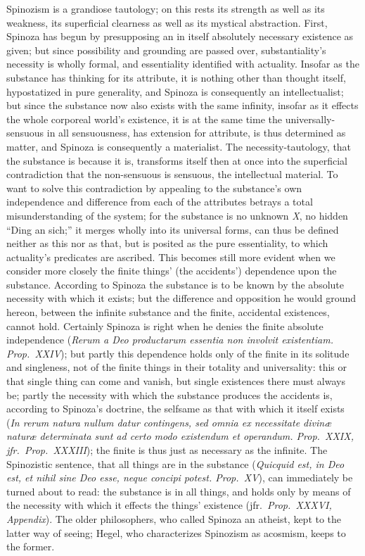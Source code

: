 \documentclass[12pt]{book}
\begin{document}
Spinozism is a grandiose tautology; on this rests its strength as well as
its weakness, its superficial clearness as well as its mystical abstraction.
First, Spinoza has begun by presupposing an in itself absolutely necessary
existence as given; but since possibility and grounding are passed over,
substantiality's necessity is wholly formal, and essentiality identified
with actuality. Insofar as the substance has thinking for its attribute, it
is nothing other than thought itself, hypostatized in pure generality, and
Spinoza is consequently an intellectualist; but since the substance now also
exists with the same infinity, insofar as it effects the whole corporeal
world's existence, it is at the same time the universally-sensuous in all
sensuousness, has extension for attribute, is thus determined as matter, and
Spinoza is consequently a materialist. The necessity-tautology, that the
substance is because it is, transforms itself then at once into the
superficial contradiction that the non-sensuous is sensuous, the
intellectual material. To want to solve this contradiction by appealing to
the substance's own independence and difference from each of the attributes
betrays a total misunderstanding of the system; for the substance is no
unknown \textit{X}, no hidden ``Ding an sich;'' it merges wholly into its
universal forms, can thus be defined neither as this nor as that, but is
posited as the pure essentiality, to which actuality's predicates are
ascribed. This becomes still more evident when we consider more closely the
finite things' (the accidents') dependence upon the substance. According to
Spinoza the substance is to be known by the absolute necessity with which it
exists; but the difference and opposition he would ground hereon, between
the infinite substance and the finite, accidental existences, cannot hold.
Certainly Spinoza is right when he denies the finite absolute independence
(\textit{Rerum a Deo productarum essentia non involvit existentiam. Prop.\
XXIV}); but partly this dependence holds only of the finite in its solitude
and singleness, not of the finite things in their totality and universality:
this or that single thing can come and vanish, but single existences there
must always be; partly the necessity with which the substance produces the
accidents is, according to Spinoza's doctrine, the selfsame as that with
which it itself exists (\textit{In rerum natura nullum datur contingens, sed
omnia ex necessitate divinæ naturæ determinata sunt ad certo modo existendum
et operandum. Prop.\ XXIX, jfr.\ Prop.\ XXXIII}); the finite is thus just as
necessary as the infinite. The Spinozistic sentence, that all things are in
the substance (\textit{Quicquid est, in Deo est, et nihil sine Deo esse,
neque concipi potest. Prop.\ XV}), can immediately be turned about to read:
the substance is in all things, and holds only by means of the necessity
with which it effects the things' existence (jfr.\ \textit{Prop.\ XXXVI,
Appendix}). The older philosophers, who called Spinoza an atheist, kept to
the latter way of seeing; Hegel, who characterizes Spinozism as acosmism,
keeps to the former.
\end{document}
